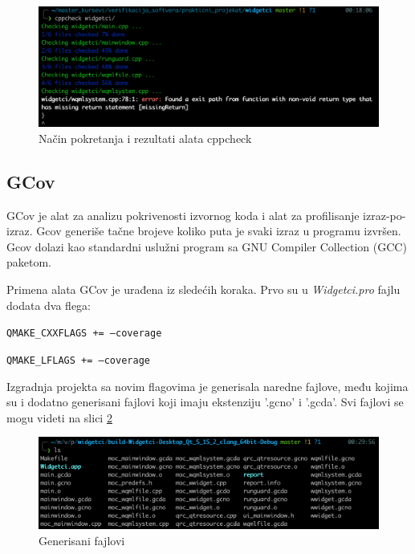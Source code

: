 \documentclass[a4paper]{article}
\begin{document}
\begin{figure}[h!]
\begin{center}
\includegraphics[scale=0.45]{cppcheck-00.png}
\end{center}
\caption{Način pokretanja i rezultati alata cppcheck}
\label{fig: cppcheck-0}
\end{figure}

\subsection{GCov}

GCov je alat za analizu pokrivenosti izvornog koda i alat za profilisanje izraz-po-izraz. Gcov generiše tačne brojeve koliko puta je svaki izraz u programu izvršen. Gcov dolazi kao standardni uslužni program sa GNU Compiler Collection (GCC) paketom.

Primena alata GCov je urađena iz sledećih koraka.
Prvo su u \textit{Widgetci.pro} fajlu dodata dva flega:

\begin{itemsize}
    \item \texttt{QMAKE\_CXXFLAGS += --coverage}
    \item \texttt{QMAKE\_LFLAGS += --coverage}
\end{itemsize}

Izgradnja projekta sa novim flagovima je generisala naredne fajlove, među kojima su i dodatno generisani fajlovi koji imaju ekstenziju '.gcno' i '.gcda'. Svi fajlovi se mogu videti na slici 
\ref{fig: GCov-00}

\begin{figure}[h!]
\begin{center}
\includegraphics[scale=0.45]{GCov-00.png}
\end{center}
\caption{Generisani fajlovi}
\label{fig: GCov-00}
\end{figure}
\end{document}

